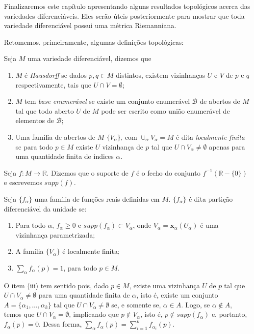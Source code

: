 Finalizaremos este capítulo apresentando alguns resultados topológicos acerca das variedades diferenciáveis. Eles serão úteis posteriormente para mostrar que toda variedade diferenciável possui uma métrica Riemanniana.

Retomemos, primeiramente, algumas definições topológicas:
\begin{definition}
	\label{def:axiomas-topologicos}
	Seja $M$ uma variedade diferenciável, dizemos que
	\begin{enumerate}[label=(\roman*)]
		\item $M$ é \emph{Hausdorff} se dados $p,q \in M$ distintos, existem vizinhanças $U$ e $V$ de $p$ e $q$ respectivamente, tais que $U\cap V=\emptyset$;
		\item $M$ tem \emph{base enumerável} se existe um conjunto enumerável $\mathcal{B}$ de abertos de $M$ tal que todo aberto $U$ de $M$ pode ser escrito como união enumerável de elementos de $\mathcal{B}$;
		\item Uma família de abertos de $M$ $\{ V_{\alpha} \}$, com $\cup_{\alpha}V_{\alpha}=M$ é dita \emph{localmente finita} se para todo $p \in M$ existe $U$ vizinhança de $p$ tal que $U\cap V_{\alpha}\neq \emptyset$ apenas para uma quantidade finita de índices $\alpha$.
	\end{enumerate}
\end{definition}
\begin{definition}
	\label{def:suporte}
	Seja $f:M\to \mathbb{R}$. Dizemos que o suporte de $f$ é o fecho do conjunto $f^{-1}(\mathbb{R}-\{ 0 \})$ e escrevemos $supp(f)$.
\end{definition}
\begin{definition}
	\label{def:particao-da-unidade}
	Seja $\{ f_{\alpha} \}$ uma família de funções reais definidas em $M$. $\{ f_{\alpha} \}$ é dita partição diferenciável da unidade se:
	\begin{enumerate}[label=(\roman*)]
		\item Para todo $\alpha$, $f_{\alpha}\geq0$ e $supp(f_{\alpha})\subset V_{\alpha}$, onde $V_{\alpha}=\mathbf{x}_{\alpha}(U_{\alpha})$ é uma vizinhança parametrizada;
		\item A família $\{ V_{\alpha} \}$ é localmente finita;
		\item $\sum_{\alpha}f_{\alpha}(p)=1$, para todo $p \in M$.
	\end{enumerate}

	O item (iii) tem sentido pois, dado $p \in M$, existe uma vizinhança $U$ de $p$ tal que $U\cap V_{\alpha}\neq \emptyset$ para uma quantidade finita de $\alpha$, isto é, existe um conjunto $A=\{ \alpha_{1}, \dots, \alpha _{k} \}$ tal que $U\cap V_{\alpha}\neq \emptyset$ se, e somente se, $\alpha \in A$. Logo, se $\alpha \not\in A$, temos que $U\cap V_{\alpha}=\emptyset$, implicando que $p \not\in V_{\alpha}$, isto é, $p \not\in supp(f_{\alpha})$ e, portanto, $f_{\alpha}(p)=0$. Dessa forma, $\sum_{\alpha}f_{\alpha}(p)=\sum_{i=1}^{k}f_{\alpha_{i}}(p)$.
\end{definition}
